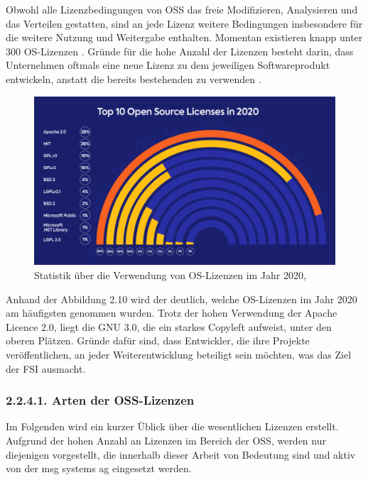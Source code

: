 Obwohl alle Lizenzbedingungen von OSS das freie Modifizieren, Analysieren und das Verteilen gestatten, sind an jede Lizenz weitere Bedingungen insbesondere für die weitere Nutzung und Weitergabe enthalten. Momentan existieren knapp unter 300 OS-Lizenzen \cite{linux_fondation_spdx_2018}. Gründe für die hohe Anzahl der Lizenzen besteht darin, dass Unternehmen oftmals eine neue Lizenz zu dem jeweiligen Softwareprodukt entwickeln, anstatt die bereits bestehenden zu verwenden \cite[S. 33]{schaaf_open-source-lizenzen_2013}. 

\begin{figure}[h]
    \centering
    \includegraphics[scale=0.35]{Bilder/Statistik Verwendung OSS.png}
    \caption{Statistik über die Verwendung von OS-Lizenzen im Jahr 2020, \cite{whitesource_software_open_2021}}
\end{figure}

Anhand der Abbildung 2.10 wird der deutlich, welche OS-Lizenzen im Jahr 2020 am häufigsten genommen wurden. Trotz der hohen Verwendung der Apache Licence 2.0, liegt die GNU 3.0, die ein starkes Copyleft aufweist, unter den oberen Plätzen. Gründe dafür sind, dass Entwickler, die ihre Projekte veröffentlichen, an jeder Weiterentwicklung beteiligt sein möchten, was das Ziel der FSI ausmacht. 

\subsubsection{2.2.4.1. Arten der OSS-Lizenzen}

Im Folgenden wird ein kurzer Üblick über die wesentlichen Lizenzen erstellt. Aufgrund der hohen Anzahl an Lizenzen im Bereich der OSS, werden nur diejenigen vorgestellt, die innerhalb dieser Arbeit von Bedeutung sind und aktiv von der msg systems ag eingesetzt werden. 

